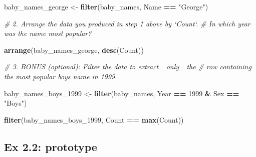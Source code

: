 \documentclass[]{book}
\newenvironment{Shaded}{\begin{snugshade}}{\end{snugshade}}
\newcommand{\KeywordTok}[1]{\textcolor[rgb]{0.13,0.29,0.53}{\textbf{#1}}}
\newcommand{\DecValTok}[1]{\textcolor[rgb]{0.00,0.00,0.81}{#1}}
\newcommand{\StringTok}[1]{\textcolor[rgb]{0.31,0.60,0.02}{#1}}
\newcommand{\CommentTok}[1]{\textcolor[rgb]{0.56,0.35,0.01}{\textit{#1}}}
\newcommand{\OperatorTok}[1]{\textcolor[rgb]{0.81,0.36,0.00}{\textbf{#1}}}
\newcommand{\NormalTok}[1]{#1}
\begin{document}
\begin{Shaded}
\begin{Highlighting}[]
\NormalTok{baby_names_george <-}\StringTok{ }\KeywordTok{filter}\NormalTok{(baby_names, Name }\OperatorTok{==}\StringTok{ "George"}\NormalTok{)}
\end{Highlighting}
\end{Shaded}

\begin{Shaded}
\begin{Highlighting}[]
\CommentTok{# 2.  Arrange the data you produced in step 1 above by `Count`. }
\CommentTok{#     In which year was the name most popular?}
\end{Highlighting}
\end{Shaded}

\begin{Shaded}
\begin{Highlighting}[]
\KeywordTok{arrange}\NormalTok{(baby_names_george, }\KeywordTok{desc}\NormalTok{(Count))}
\end{Highlighting}
\end{Shaded}

\begin{Shaded}
\begin{Highlighting}[]
\CommentTok{# 3.  BONUS (optional): Filter the data to extract _only_ the }
\CommentTok{#     row containing the most popular boys name in 1999.}
\end{Highlighting}
\end{Shaded}

\begin{Shaded}
\begin{Highlighting}[]
\NormalTok{baby_names_boys_}\DecValTok{1999}\NormalTok{ <-}\StringTok{ }\KeywordTok{filter}\NormalTok{(baby_names, }
\NormalTok{                    Year }\OperatorTok{==}\StringTok{ }\DecValTok{1999} \OperatorTok{&}\StringTok{ }\NormalTok{Sex }\OperatorTok{==}\StringTok{ "Boys"}\NormalTok{)}
\end{Highlighting}
\end{Shaded}

\begin{Shaded}
\begin{Highlighting}[]
\KeywordTok{filter}\NormalTok{(baby_names_boys_}\DecValTok{1999}\NormalTok{, Count }\OperatorTok{==}\StringTok{ }\KeywordTok{max}\NormalTok{(Count))}
\end{Highlighting}
\end{Shaded}

\subsection{Ex 2.2: prototype}\label{ex-2.2-prototype}
\end{document}
